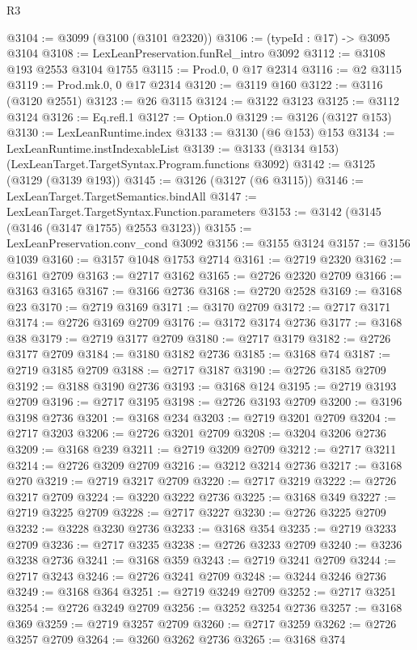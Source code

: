 \begin{lexlean}{R3}
\begin{coremodule}
@3104 := @3099 (@3100 (@3101 @2320))
@3106 := (typeId : @17) -> @3095 @3104
@3108 := LexLeanPreservation.funRel_intro @3092
@3112 := @3108 @193 @2553 @3104 @1755
@3115 := Prod.{0, 0} @17 @2314
@3116 := @2 @3115
@3119 := Prod.mk.{0, 0} @17 @2314
@3120 := @3119 @160
@3122 := @3116 (@3120 @2551)
@3123 := @26 @3115
@3124 := @3122 @3123
@3125 := @3112 @3124
@3126 := Eq.refl.{1}
@3127 := Option.{0}
@3129 := @3126 (@3127 @153)
@3130 := LexLeanRuntime.index
@3133 := @3130 (@6 @153) @153
@3134 := LexLeanRuntime.instIndexableList
@3139 := @3133 (@3134 @153) (LexLeanTarget.TargetSyntax.Program.functions @3092)
@3142 := @3125 (@3129 (@3139 @193))
@3145 := @3126 (@3127 (@6 @3115))
@3146 := LexLeanTarget.TargetSemantics.bindAll
@3147 := LexLeanTarget.TargetSyntax.Function.parameters
@3153 := @3142 (@3145 (@3146 (@3147 @1755) @2553 @3123))
@3155 := LexLeanPreservation.conv_cond @3092
@3156 := @3155 @3124
@3157 := @3156 @1039
@3160 := @3157 @1048 @1753 @2714
@3161 := @2719 @2320
@3162 := @3161 @2709
@3163 := @2717 @3162
@3165 := @2726 @2320 @2709
@3166 := @3163 @3165
@3167 := @3166 @2736
@3168 := @2720 @2528
@3169 := @3168 @23
@3170 := @2719 @3169
@3171 := @3170 @2709
@3172 := @2717 @3171
@3174 := @2726 @3169 @2709
@3176 := @3172 @3174 @2736
@3177 := @3168 @38
@3179 := @2719 @3177 @2709
@3180 := @2717 @3179
@3182 := @2726 @3177 @2709
@3184 := @3180 @3182 @2736
@3185 := @3168 @74
@3187 := @2719 @3185 @2709
@3188 := @2717 @3187
@3190 := @2726 @3185 @2709
@3192 := @3188 @3190 @2736
@3193 := @3168 @124
@3195 := @2719 @3193 @2709
@3196 := @2717 @3195
@3198 := @2726 @3193 @2709
@3200 := @3196 @3198 @2736
@3201 := @3168 @234
@3203 := @2719 @3201 @2709
@3204 := @2717 @3203
@3206 := @2726 @3201 @2709
@3208 := @3204 @3206 @2736
@3209 := @3168 @239
@3211 := @2719 @3209 @2709
@3212 := @2717 @3211
@3214 := @2726 @3209 @2709
@3216 := @3212 @3214 @2736
@3217 := @3168 @270
@3219 := @2719 @3217 @2709
@3220 := @2717 @3219
@3222 := @2726 @3217 @2709
@3224 := @3220 @3222 @2736
@3225 := @3168 @349
@3227 := @2719 @3225 @2709
@3228 := @2717 @3227
@3230 := @2726 @3225 @2709
@3232 := @3228 @3230 @2736
@3233 := @3168 @354
@3235 := @2719 @3233 @2709
@3236 := @2717 @3235
@3238 := @2726 @3233 @2709
@3240 := @3236 @3238 @2736
@3241 := @3168 @359
@3243 := @2719 @3241 @2709
@3244 := @2717 @3243
@3246 := @2726 @3241 @2709
@3248 := @3244 @3246 @2736
@3249 := @3168 @364
@3251 := @2719 @3249 @2709
@3252 := @2717 @3251
@3254 := @2726 @3249 @2709
@3256 := @3252 @3254 @2736
@3257 := @3168 @369
@3259 := @2719 @3257 @2709
@3260 := @2717 @3259
@3262 := @2726 @3257 @2709
@3264 := @3260 @3262 @2736
@3265 := @3168 @374

\end{coremodule}
\end{lexlean}
